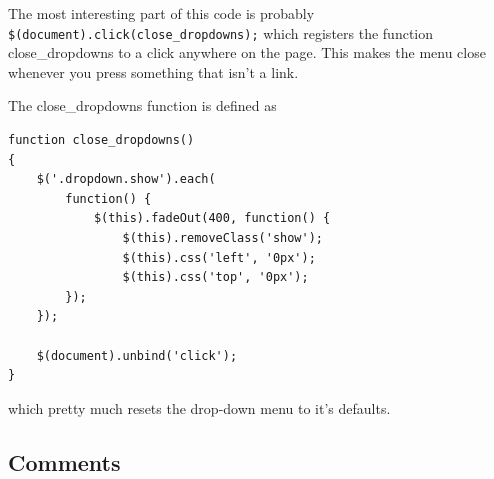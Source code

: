 \documentclass[a4paper]{scrartcl}
\begin{document}
The most interesting part of this code is probably \texttt{\$(document).click(close\_dropdowns);} which registers the function close\_dropdowns to a click anywhere on the page. This makes the menu close whenever you press something that isn't a link.

The close\_dropdowns function is defined as

\begin{lstlisting}
function close_dropdowns()                                                      
{                                                                               
    $('.dropdown.show').each(                                                   
        function() {                                                            
            $(this).fadeOut(400, function() {                                   
                $(this).removeClass('show');                                    
                $(this).css('left', '0px');                                     
                $(this).css('top', '0px');                                      
        });                                                                     
    });                                                                         
                                                                                
    $(document).unbind('click');                                                
} 
\end{lstlisting}

which pretty much resets the drop-down menu to it's defaults.

\subsection{Comments}
\end{document}
